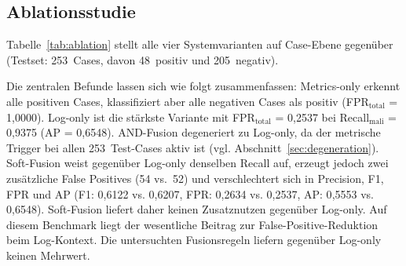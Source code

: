 \subsection{Ablationsstudie}
\label{sec:ablation}

Tabelle~\ref{tab:ablation} stellt alle vier Systemvarianten auf Case-Ebene gegenüber (Testset: 253~Cases, davon 48~positiv und 205~negativ).

\begin{table}[htb]
  \centering
  \caption{Ablationsergebnisse auf Case-Ebene}
  \label{tab:ablation}
  \begingroup
  \setlength{\tabcolsep}{1.5pt}%
  \renewcommand{\arraystretch}{1.25}%
  \endgroup
\end{table}

Die zentralen Befunde lassen sich wie folgt zusammenfassen: Metrics-only erkennt alle positiven Cases, klassifiziert aber alle negativen Cases als positiv (FPR$_{\text{total}}$ = 1{,}0000). Log-only ist die stärkste Variante mit FPR$_{\text{total}}$ = 0{,}2537 bei Recall$_{\text{mali}}$ = 0{,}9375 (AP = 0{,}6548). AND-Fusion degeneriert zu Log-only, da der metrische Trigger bei allen 253~Test-Cases aktiv ist (vgl. Abschnitt~\ref{sec:degeneration}). Soft-Fusion weist gegenüber Log-only denselben Recall auf, erzeugt jedoch zwei zusätzliche False Positives (54 vs.~52) und verschlechtert sich in Precision, F1, FPR und AP (F1: 0{,}6122 vs. 0{,}6207, FPR: 0{,}2634 vs. 0{,}2537, AP: 0{,}5553 vs. 0{,}6548). Soft-Fusion liefert daher keinen Zusatznutzen gegenüber Log-only. Auf diesem Benchmark liegt der wesentliche Beitrag zur False-Positive-Reduktion beim Log-Kontext. Die untersuchten Fusionsregeln liefern gegenüber Log-only keinen Mehrwert.

